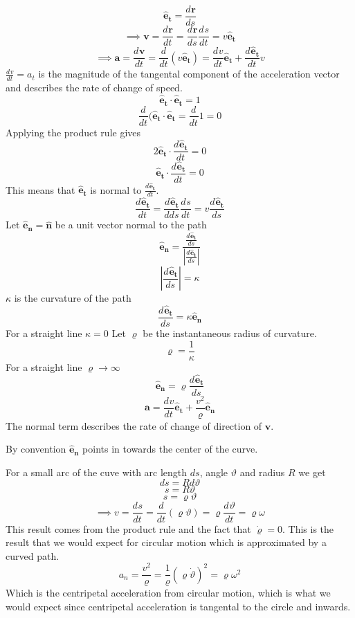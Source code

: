 \documentclass{article}
\newcommand{\vh}[1]{\vec{\hat{#1}}}
\renewcommand{\vec}[1]{\bm{#1}}
\newcommand{\vv}[1]{\vec{#1}}
\newcommand{\ve}[1]{\vec{\hat{e}_{#1}}}
\newcommand{\dv}[3][]{\frac{d^{#1}{#2}}{d{#3}^{#1}}}
\newcommand{\diff}[2][]{\frac{d^{#1}}{d{#2}^{#1}}}
\begin{document}
\[\ve t=\dv{\vv r}{s}\]
\[\implies\vv v=\dv{\vv r}{t}=\dv{\vv r}{s}\dv{s}{t}=v\ve t\]
\[\implies\vv a=\dv{\vv v}{t}=\diff t(v\ve t)=\dv vt\ve t+\dv{\ve t}{t}v\]
\(\displaystyle{\dv vt}=a_t\) is the magnitude of the tangental component of the acceleration vector and describes the rate of change of speed.
\[\ve t\cdot\ve t=1\]
\[\diff t(\ve t\cdot\ve t=\diff t1=0\]
Applying the product rule gives
\[2\ve t\cdot\dv{\ve t}{t}=0\]
\[\ve t\cdot\dv{\ve t}{t}=0\]
This means that \(\ve t\) is normal to \(\dv{\ve t}{t}\).
\[\dv{\ve t}{t}=\dv{\ve t}{ds}\dv st=v\dv{\ve t}{s}\]
Let \(\ve n=\vh n\) be a unit vector normal to the path
\[\ve n=\frac{\dv{\ve t}{s}}{\left|\dv{\ve t}{s}\right|}\]
\[\left|\dv{\ve t}{s}\right|=\kappa\]
\(\kappa\) is the curvature of the path
\[\dv{\ve t}{s}=\kappa \ve n\]
For a straight line \(\kappa =0\)
Let \(\varrho\) be the instantaneous radius of curvature.
\[\varrho=\frac{1}{\kappa}\]
For a straight line \(\varrho\to\infty\)
\[\ve n=\varrho\dv{\ve t}{s}\]
\[\vv a=\dv vt\ve t+\frac{v^2}{\varrho}\ve n\]
The normal term describes the rate of change of direction of \(\vv v\). 

By convention \(\ve n\) points in towards the center of the curve.

For a small arc of the cuve with arc length \(ds\), angle \(\vartheta\) and radius \(R\) we get
\[ds=Rd\vartheta\]
\[s=R\vartheta\]
\[s=\varrho\vartheta\]
\[\implies v=\dv st=\diff t(\varrho\vartheta)=\varrho\dv{\vartheta}{t}=\varrho\omega\]
This result comes from the product rule and the fact that \(\dot\varrho=0\). This is the result that we would expect for circular motion which is approximated by a curved path.
\[a_n=\frac{v^2}{\varrho}=\frac{1}{\varrho}(\varrho\dot\vartheta)^2=\varrho\omega^2\]
Which is the centripetal acceleration from circular motion, which is what we would expect since centripetal acceleration is tangental to the circle and inwards.
\end{document}
